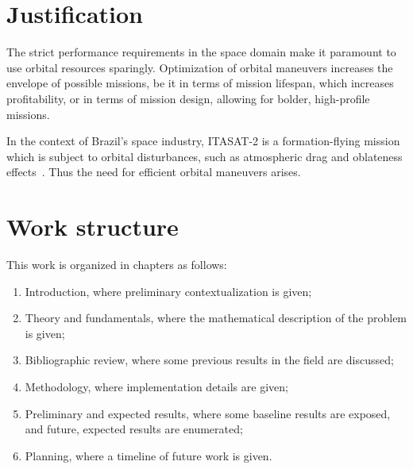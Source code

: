 \section{Justification}

The strict performance requirements in the space domain make it paramount to use orbital resources sparingly. Optimization of orbital maneuvers increases the envelope of possible missions, be it in terms of mission lifespan, which increases profitability, or in terms of mission design, allowing for bolder, high-profile missions. 

In the context of Brazil's space industry, ITASAT-2 is a formation-flying mission which is subject to orbital disturbances, such as atmospheric drag and oblateness effects~\cite{itasat2}. Thus the need for efficient orbital maneuvers arises.


\section{Work structure}

This work is organized in chapters as follows:
\begin{enumerate}
    \item Introduction, where preliminary contextualization is given;
    \item Theory and fundamentals, where the mathematical description of the problem is given;
    \item Bibliographic review, where some previous results in the field are discussed;
    \item Methodology, where implementation details are given;
    \item Preliminary and expected results, where some baseline results are exposed, and future, expected results are enumerated;
    \item Planning, where a timeline of future work is given.
\end{enumerate}